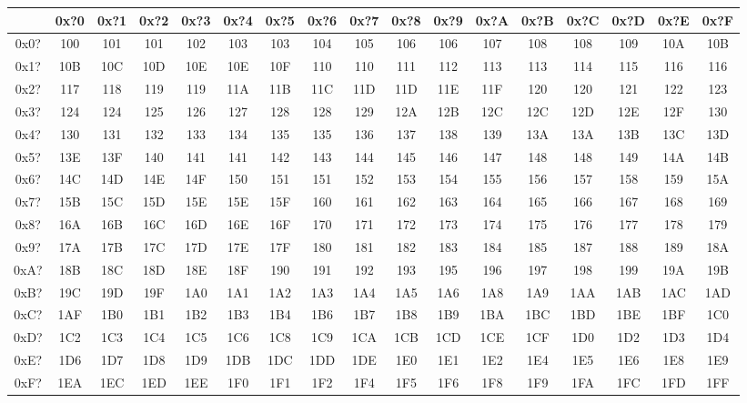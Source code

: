 {\ttfamily
\begin{tabular}{| c | c | c | c | c | c | c | c | c | c | c | c | c | c | c | c | c |}
\hline
& 0x?0 & 0x?1 & 0x?2 & 0x?3 & 0x?4 & 0x?5 & 0x?6 & 0x?7 & 0x?8 & 0x?9 & 0x?A & 0x?B & 0x?C & 0x?D & 0x?E & 0x?F \\
\hline
0x0? & 100 & 101 & 101 & 102 & 103 & 103 & 104 & 105 & 106 & 106 & 107 & 108 & 108 & 109 & 10A & 10B \\
0x1? & 10B & 10C & 10D & 10E & 10E & 10F & 110 & 110 & 111 & 112 & 113 & 113 & 114 & 115 & 116 & 116 \\
0x2? & 117 & 118 & 119 & 119 & 11A & 11B & 11C & 11D & 11D & 11E & 11F & 120 & 120 & 121 & 122 & 123 \\
0x3? & 124 & 124 & 125 & 126 & 127 & 128 & 128 & 129 & 12A & 12B & 12C & 12C & 12D & 12E & 12F & 130 \\
0x4? & 130 & 131 & 132 & 133 & 134 & 135 & 135 & 136 & 137 & 138 & 139 & 13A & 13A & 13B & 13C & 13D \\
0x5? & 13E & 13F & 140 & 141 & 141 & 142 & 143 & 144 & 145 & 146 & 147 & 148 & 148 & 149 & 14A & 14B \\
0x6? & 14C & 14D & 14E & 14F & 150 & 151 & 151 & 152 & 153 & 154 & 155 & 156 & 157 & 158 & 159 & 15A \\
0x7? & 15B & 15C & 15D & 15E & 15E & 15F & 160 & 161 & 162 & 163 & 164 & 165 & 166 & 167 & 168 & 169 \\
0x8? & 16A & 16B & 16C & 16D & 16E & 16F & 170 & 171 & 172 & 173 & 174 & 175 & 176 & 177 & 178 & 179 \\
0x9? & 17A & 17B & 17C & 17D & 17E & 17F & 180 & 181 & 182 & 183 & 184 & 185 & 187 & 188 & 189 & 18A \\
0xA? & 18B & 18C & 18D & 18E & 18F & 190 & 191 & 192 & 193 & 195 & 196 & 197 & 198 & 199 & 19A & 19B \\
0xB? & 19C & 19D & 19F & 1A0 & 1A1 & 1A2 & 1A3 & 1A4 & 1A5 & 1A6 & 1A8 & 1A9 & 1AA & 1AB & 1AC & 1AD \\
0xC? & 1AF & 1B0 & 1B1 & 1B2 & 1B3 & 1B4 & 1B6 & 1B7 & 1B8 & 1B9 & 1BA & 1BC & 1BD & 1BE & 1BF & 1C0 \\
0xD? & 1C2 & 1C3 & 1C4 & 1C5 & 1C6 & 1C8 & 1C9 & 1CA & 1CB & 1CD & 1CE & 1CF & 1D0 & 1D2 & 1D3 & 1D4 \\
0xE? & 1D6 & 1D7 & 1D8 & 1D9 & 1DB & 1DC & 1DD & 1DE & 1E0 & 1E1 & 1E2 & 1E4 & 1E5 & 1E6 & 1E8 & 1E9 \\
0xF? & 1EA & 1EC & 1ED & 1EE & 1F0 & 1F1 & 1F2 & 1F4 & 1F5 & 1F6 & 1F8 & 1F9 & 1FA & 1FC & 1FD & 1FF \\
\hline
\end{tabular}
}


